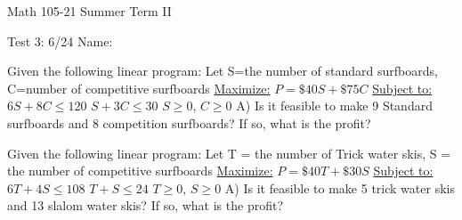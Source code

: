 \documentclass[11pt,epsfig]{article}
\begin{document}
Math 105-21 Summer Term II 

Test 3: 6/24 \hspace{1.9in} {Name:} {\underline {\hspace{3.5in}}}
\vspace{1pc}


\begin{problem}{15}
Given the following linear program:
\newline
\newline
Let S=the number of standard surfboards, C=number of competitive surfboards
\newline
\underline{Maximize:}\hspace*{0.5cm} $P=\$40S+\$75C$
\newline
\underline{Subject to:}\hspace*{0.45cm}
$6S+8C\leq 120$ 
\newline
\hspace*{2.4cm}$S+3C\leq 30$
\newline
\hspace*{2.4cm}$S \geq 0$, $C\geq 0$
\newline
\newline
A) Is it feasible to make 9 Standard surfboards and 8 competition surfboards? If so, what is the profit?
\vfill
\end{problem}





\begin{problem}{15}
Given the following linear program:
\newline
\newline
Let T = the number of Trick water skis, S = the number of competitive surfboards
\newline
\underline{Maximize:}\hspace*{0.5cm}  $P=\$40T+\$30S$
\newline
\underline{Subject to:}\hspace*{0.45cm} $6T+4S\leq 108$ 
\newline
\hspace*{2.4cm}$T+S\leq 24$
\newline
\hspace*{2.4cm}$T \geq 0$, $S\geq 0$
\newline
\newline
A) Is it feasible to make 5 trick water skis and 13 slalom water skis? If so, what is the profit?
\vfill
\end{problem}
\end{document}
